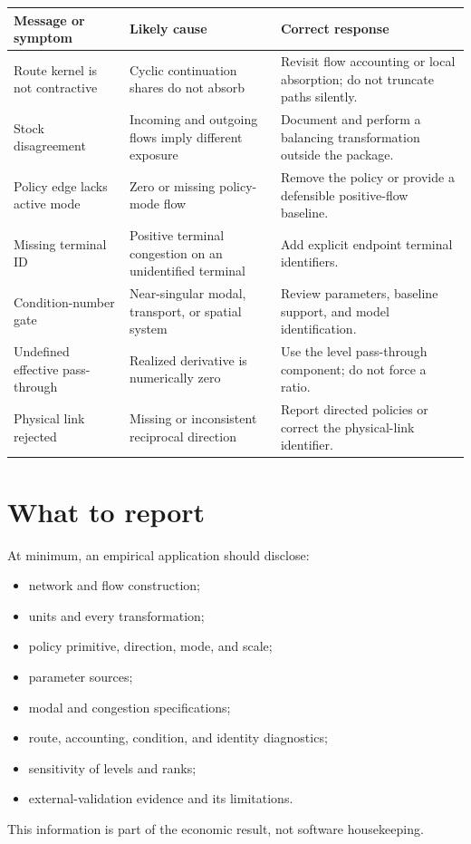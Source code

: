 \begin{longtable}{p{}p{}p{}}
\toprule
Message or symptom & Likely cause & Correct response \\
\midrule
\endhead
Route kernel is not contractive & Cyclic continuation shares do not absorb &
Revisit flow accounting or local absorption; do not truncate paths silently. \\
Stock disagreement & Incoming and outgoing flows imply different exposure &
Document and perform a balancing transformation outside the package. \\
Policy edge lacks active mode & Zero or missing policy-mode flow & Remove the
policy or provide a defensible positive-flow baseline. \\
Missing terminal ID & Positive terminal congestion on an unidentified terminal
& Add explicit endpoint terminal identifiers. \\
Condition-number gate & Near-singular modal, transport, or spatial system &
Review parameters, baseline support, and model identification. \\
Undefined effective pass-through & Realized derivative is numerically zero &
Use the level pass-through component; do not force a ratio. \\
Physical link rejected & Missing or inconsistent reciprocal direction &
Report directed policies or correct the physical-link identifier. \\
\bottomrule
\end{longtable}

\section{What to report}

At minimum, an empirical application should disclose:
\begin{itemize}
  \item network and flow construction;
  \item units and every transformation;
  \item policy primitive, direction, mode, and scale;
  \item parameter sources;
  \item modal and congestion specifications;
  \item route, accounting, condition, and identity diagnostics;
  \item sensitivity of levels and ranks;
  \item external-validation evidence and its limitations.
\end{itemize}
This information is part of the economic result, not software housekeeping.

